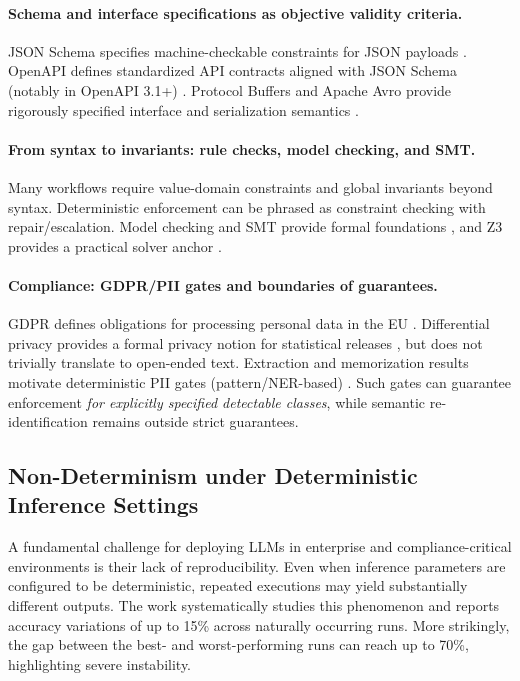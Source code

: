 \paragraph{Schema and interface specifications as objective validity criteria.}
JSON Schema specifies machine-checkable constraints for JSON payloads \cite{jsonschema202012}.
OpenAPI defines standardized API contracts aligned with JSON Schema (notably in OpenAPI 3.1+) \cite{openapi31}.
Protocol Buffers and Apache Avro provide rigorously specified interface and serialization semantics \cite{protobufproto3,avrospec}.

\paragraph{From syntax to invariants: rule checks, model checking, and SMT.}
Many workflows require value-domain constraints and global invariants beyond syntax.
Deterministic enforcement can be phrased as constraint checking with repair/escalation.
Model checking and SMT provide formal foundations \cite{baier2008principles,kroening2008decision}, and Z3 provides a practical solver anchor \cite{demoura2008z3}.

\paragraph{Compliance: GDPR/PII gates and boundaries of guarantees.}
GDPR defines obligations for processing personal data in the EU \cite{gdpr2016}.
Differential privacy provides a formal privacy notion for statistical releases \cite{dwork2014afdp}, but does not trivially translate to open-ended text.
Extraction and memorization results motivate deterministic PII gates (pattern/NER-based) \cite{carlini2021extracting,carlini2022memorization}.
Such gates can guarantee enforcement \emph{for explicitly specified detectable classes}, while semantic re-identification remains outside strict guarantees.


\subsection{Non-Determinism under Deterministic Inference Settings}
\label{subsec:nondeterminism-original}

A fundamental challenge for deploying LLMs in enterprise and compliance-critical environments is their lack of reproducibility.
Even when inference parameters are configured to be deterministic, repeated executions may yield substantially different outputs.
The work \cite{nondeterminism_llm_settings} systematically studies this phenomenon and reports accuracy variations of up to 15\% across naturally occurring runs.
More strikingly, the gap between the best- and worst-performing runs can reach up to 70\%, highlighting severe instability.

